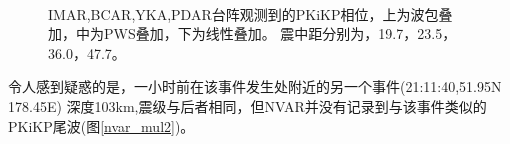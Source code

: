 \begin{figure}[tbph]
\centering
{}
\hspace{2em}
\\
\hspace{2em}
\caption{IMAR,BCAR,YKA,PDAR台阵观测到的PKiKP相位，上为波包叠加，中为PWS叠加，下为线性叠加。%
震中距分别为，19.7\textdegree，23.5\textdegree，36.0\textdegree，47.7\textdegree。}
\label{others}
\end{figure}

令人感到疑惑的是，一小时前在该事件发生处附近的另一个事件(21:11:40,51.95N 178.45E)
深度103km,震级与后者相同，但NVAR并没有记录到与该事件类似的PKiKP尾波(图\ref{nvar_mul2})。

